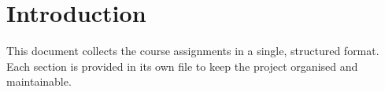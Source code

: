 \documentclass[12pt,a4paper]{article}
\begin{document}
\setcounter{secnumdepth}{-1}
\makeatletter
\renewcommand{\numberline}[1]{}
\makeatother

\tableofcontents
\newpage

\section*{Introduction}
This document collects the course assignments in a single, structured format. Each section is provided in its own file to keep the project organised and maintainable.












\newpage


\end{document}
